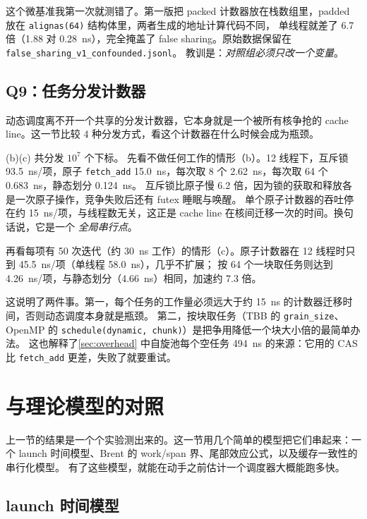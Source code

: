 \documentclass[11pt,a4paper]{ctexart}
\begin{document}
这个微基准我第一次就测错了。第一版把 packed 计数器放在栈数组里，padded 放在 \texttt{alignas(64)} 结构体里，两者生成的地址计算代码不同，
单线程就差了 6.7 倍（1.88 对 0.28~ns），完全掩盖了 false sharing。原始数据保留在 \texttt{false\_\allowbreak{}sharing\_\allowbreak{}v1\_\allowbreak{}confounded.jsonl}。
教训是：\emph{对照组必须只改一个变量}。

\subsection{Q9：任务分发计数器}
\label{sec:dispatch}

动态调度离不开一个共享的分发计数器，它本身就是一个被所有核争抢的 cache line。这一节比较 4 种分发方式，看这个计数器在什么时候会成为瓶颈。

(b)(c) 共分发 $10^7$ 个下标。
先看不做任何工作的情形（b）。12 线程下，互斥锁 93.5~ns/项，原子 \texttt{fetch\_\allowbreak{}add} 15.0~ns，每次取 8 个 2.62~ns，每次取 64 个 0.683~ns，静态划分 0.124~ns。
互斥锁比原子慢 6.2 倍，因为锁的获取和释放各是一次原子操作，竞争失败后还有 futex 睡眠与唤醒。
单个原子计数器的吞吐停在约 15~ns/项，与线程数无关，这正是 cache line 在核间迁移一次的时间。换句话说，它是一个 \emph{全局串行点}。

再看每项有 50 次迭代（约 30~ns 工作）的情形（c）。原子计数器在 12 线程时只到 45.5~ns/项（单线程 58.0~ns），几乎不扩展；
按 64 个一块取任务则达到 4.26~ns/项，与静态划分（4.66~ns）相同，加速约 7.3 倍。

这说明了两件事。第一，每个任务的工作量必须远大于约 15~ns 的计数器迁移时间，否则动态调度本身就是瓶颈。
第二，按块取任务（TBB 的 \texttt{grain\_\allowbreak{}size}、OpenMP 的 \texttt{schedule(dynamic, chunk)}）是把争用降低一个块大小倍的最简单办法。
这也解释了\cref{sec:overhead} 中自旋池每个空任务 494~ns 的来源：它用的 CAS 比 \texttt{fetch\_\allowbreak{}add} 更差，失败了就要重试。

\section{与理论模型的对照}
\label{sec:theory}

上一节的结果是一个个实验测出来的。这一节用几个简单的模型把它们串起来：一个 launch 时间模型、Brent 的 work/span 界、尾部效应公式，以及缓存一致性的串行化模型。
有了这些模型，就能在动手之前估计一个调度器大概能跑多快。

\subsection{launch 时间模型}
\end{document}
